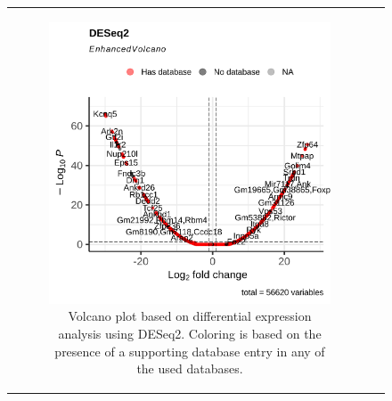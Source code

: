 \begin{figure}[H] \begin{tabular}{cc} \begin{subfigure}{0.5\textwidth}
                 \centering

                 \includegraphics[width=\linewidth]{chapters/4_results_and_discussion/figures/dea/deseq2/esr1/volcano.png}
                 \caption{Volcano plot based on differential expression
                     analysis using DESeq2.
                     Coloring is based on the presence of a supporting database entry in any of the
                     used databases.
                 } \label{fig:esr1_volcano} \end{subfigure}
        \begin{subfigure}{0.5\textwidth} \centering


\end{subfigure}
\end{tabular}
\end{figure}
